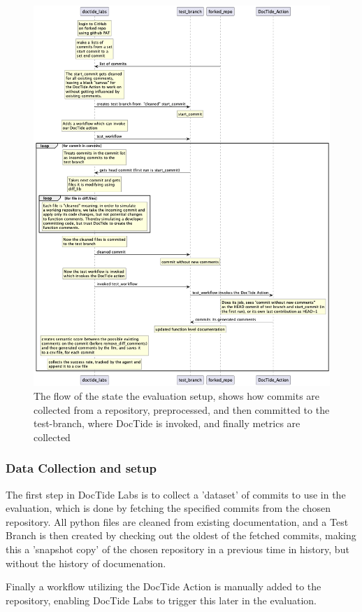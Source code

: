 \begin{figure}[H]
\centering
\includegraphics[width=0.7\linewidth]{Figures/doctide_labs_flow_chart.png}
\caption{The flow of the state the evaluation setup, shows how commits are collected from a repository, preprocessed, and then committed to the test-branch, where DocTide is invoked, and finally metrics are collected}
\label{fig:flow_labs}
\end{figure}

\subsubsection{Data Collection and setup}
The first step in DocTide Labs is to collect a 'dataset' of commits to use in the evaluation, which is done by fetching the specified commits from the chosen repository. All python files are cleaned from existing documentation, and a Test Branch is then created by checking out the oldest of the fetched commits, making this a 'snapshot copy' of the chosen repository in a previous time in history, but without the history of documenation.

Finally a workflow utilizing the DocTide Action is manually added to the repository, enabling DocTide Labs to trigger this later in the evaluation.

